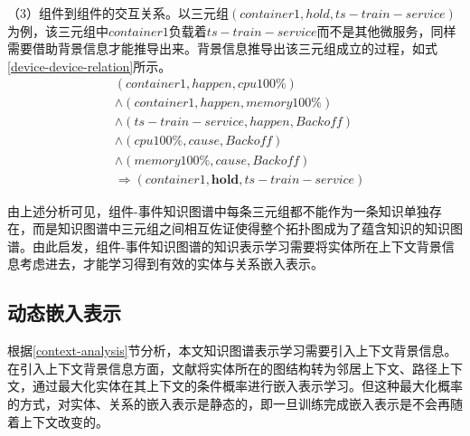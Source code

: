 （3）组件到组件的交互关系。以三元组$\left( container1, hold, ts-train-service \right)$为例，该三元组中$container1$负载着$ts-train-service$而不是其他微服务，同样需要借助背景信息才能推导出来。背景信息推导出该三元组成立的过程，如式\ref{device-device-relation}所示。
\begin{equation}
    \begin{aligned}
        &\left ( container1, happen,  cpu 100\% \right ) \\
        &\wedge \left ( container1, happen,  memory 100\% \right) \\
        &\wedge \left ( ts-train-service, happen,  Backoff \right) \\
        &\wedge \left ( cpu 100\%, cause,  Backoff \right) \\
        &\wedge \left ( memory 100\%, cause,  Backoff \right) \\
        &\Rightarrow \left ( container1, \boldsymbol{hold}, ts-train-service \right )
    \end{aligned}
\label{device-device-relation}
\end{equation}

由上述分析可见，组件-事件知识图谱中每条三元组都不能作为一条知识单独存在，而是知识图谱中三元组之间相互佐证使得整个拓扑图成为了蕴含知识的知识图谱。由此启发，组件-事件知识图谱的知识表示学习需要将实体所在上下文背景信息考虑进去，才能学习得到有效的实体与关系嵌入表示。
\subsection{动态嵌入表示}
根据\ref{context-analysis}节分析，本文知识图谱表示学习需要引入上下文背景信息。在引入上下文背景信息方面，文献\parencite{feng2016gake,shi2017knowledge}将实体所在的图结构转为邻居上下文、路径上下文，通过最大化实体在其上下文的条件概率进行嵌入表示学习。但这种最大化概率的方式，对实体、关系的嵌入表示是静态的，即一旦训练完成嵌入表示是不会再随着上下文改变的。

